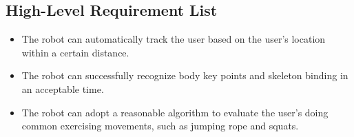 \subsection{High-Level Requirement List}
\begin{itemize}
    \item The robot can automatically track the user based on the user's location within a certain distance.
    \item The robot can successfully recognize body key points and skeleton binding in an acceptable time.
    \item The robot can adopt a reasonable algorithm to evaluate the user's doing common exercising movements, such as jumping rope and squats.
\end{itemize}
